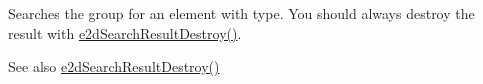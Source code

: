 Searches the group for an element with type. You should always destroy the result with \hyperlink{group__e2dGroup_ga0775c9a7e2ec5311263f84339afb52bc}{e2d\-Search\-Result\-Destroy()}. 

\begin{DoxySeeAlso}{See also}
\hyperlink{group__e2dGroup_ga0775c9a7e2ec5311263f84339afb52bc}{e2d\-Search\-Result\-Destroy()} 
\end{DoxySeeAlso}
